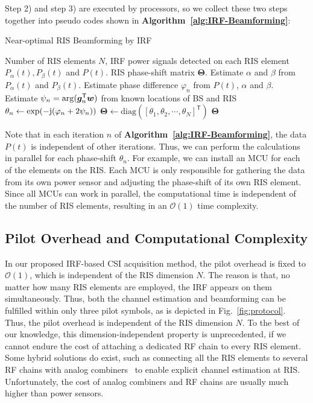 \documentclass[journal,twocolumn]{IEEEtran}
\theoremstyle{nonumberplain}
\def \T {\bm \Theta}
\def \diag {\text{diag}}
\def \exp {\text{exp}}
\def \T {^{\mathsf{T}}}
\begin{document}
    Step 2) and step 3) are executed by processors, so we collect these two steps together into pseudo codes shown in {\bf Algorithm~\ref{alg:IRF-Beamforming}}:
    \begin{algorithm}[t] 
        \caption{Near-optimal RIS Beamforming by IRF} \label{alg:IRF-Beamforming}
        \begin{algorithmic}[1]
            \REQUIRE Number of RIS elements $N$, IRF power signals detected on each RIS element $P_{\alpha}(t), P_{\beta}(t)$ and $P(t)$.
            \ENSURE RIS phase-shift matrix ${\bm \Theta}$.
                \STATE Estimate $\alpha$ and $\beta$ from $P_{\alpha}(t)$ and $P_{\beta}(t)$.
                \STATE Estimate phase difference $\varphi_n$ from $P(t)$, $\alpha$ and $\beta$. 
                \STATE Estimate $\psi_{n} = {\rm arg}(\bm g_{n}\T\bm w)$ from known locations of BS and RIS
                \STATE $\theta_n \leftarrow \exp(-{\rm j}(\varphi_n + 2\psi_n))$
            \ENDFOR
            \STATE ${\bm \Theta} \leftarrow \diag\left(\left[\theta_1, \theta_2, \cdots, \theta_N\right]\T\right)$
            \RETURN ${\bm \Theta}$
        \end{algorithmic}
    \end{algorithm}
    Note that in each iteration $n$ of {\bf Algorithm~\ref{alg:IRF-Beamforming}}, the data $P(t)$ is independent of other iterations. Thus, we can perform the calculations in parallel for each phase-shift $\theta_n$. For example, we can install an MCU for each of the elements on the RIS. Each MCU is only responsible for gathering the data from its own power sensor and adjusting the phase-shift of its own RIS element. Since all MCUs can work in parallel, the computational time is independent of the number of RIS elements, resulting in an $\mathcal{O}(1)$ time complexity. 


\subsection{Pilot Overhead and Computational Complexity}\label{Pilot Overhead}
    In our proposed IRF-based CSI acquisition method, the pilot overhead is fixed to $\mathcal{O}(1)$, which is independent of the RIS dimension $N$. 
    The reason is that, no matter how many RIS elements are employed, the IRF appears on them simultaneously. 
    Thus, both the channel estimation and beamforming can be fulfilled within only three pilot symbols, as is depicted in Fig.~\ref{fig:protocol}. 
    Thus, the pilot overhead is independent of the RIS dimension $N$. 
    To the best of our knowledge, this dimension-independent property is unprecedented, if we cannot endure the cost of attaching a dedicated RF chain to every RIS element. Some hybrid solutions do exist, such as connecting all the RIS elements to several RF chains with analog combiners~\cite{alexandropoulos2021hybrid,alexandropoulos2020hardware} to enable explicit channel estimation at RIS. Unfortunately, the cost of analog combiners and RF chains are usually much higher than power sensors.
    
\end{document}
